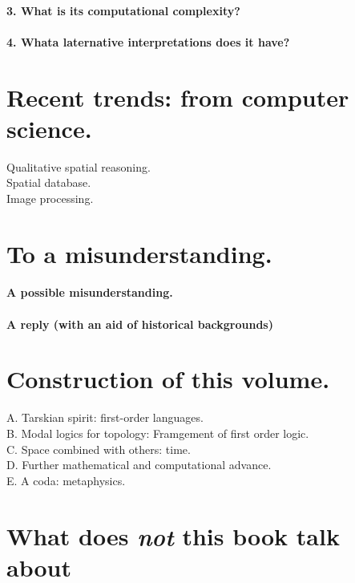 \documentclass[
10pt, %
a4paper, %
twocolumn, %
landscape %
]{article}
\begin{document}
\paragraph{3. What is its computational complexity?}
\paragraph{4. Whata laternative interpretations does it have?}

\section*{Recent trends: from computer science.}
\begin{description}
  \item [Qualitative spatial reasoning.]
  \item [Spatial database.]
  \item [Image processing.]
\end{description}

\section*{To a misunderstanding.}
\paragraph{A possible misunderstanding.}
\paragraph{A reply (with an aid of historical backgrounds)}

\section*{Construction of this volume.}

\begin{description}
  \item [A. Tarskian spirit: first-order languages.]
  \item [B. Modal logics for topology: Framgement of first order logic.]
  \item [C. Space combined with others: time.]
  \item [D. Further mathematical and computational advance.]
  \item [E. A coda: metaphysics. ]
\end{description}

\section*{What does \emph{not} this book talk about}
\end{document}
